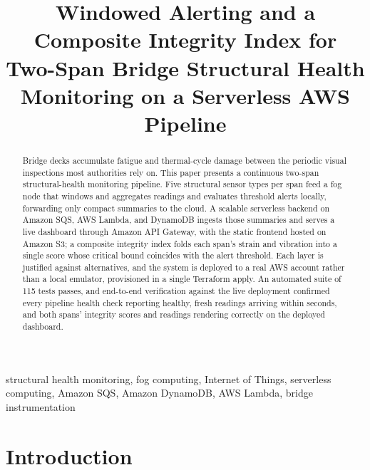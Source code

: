 \documentclass[conference]{IEEEtran}
\begin{document}
\title{Windowed Alerting and a Composite Integrity Index for Two-Span Bridge Structural Health Monitoring on a Serverless AWS Pipeline}

\author{
}

\maketitle

\begin{abstract}
Bridge decks accumulate fatigue and thermal-cycle damage between the periodic visual inspections most authorities rely on. This paper presents a continuous two-span structural-health monitoring pipeline. Five structural sensor types per span feed a fog node that windows and aggregates readings and evaluates threshold alerts locally, forwarding only compact summaries to the cloud. A scalable serverless backend on Amazon SQS, AWS Lambda, and DynamoDB ingests those summaries and serves a live dashboard through Amazon API Gateway, with the static frontend hosted on Amazon S3; a composite integrity index folds each span's strain and vibration into a single score whose critical bound coincides with the alert threshold. Each layer is justified against alternatives, and the system is deployed to a real AWS account rather than a local emulator, provisioned in a single Terraform apply. An automated suite of 115 tests passes, and end-to-end verification against the live deployment confirmed every pipeline health check reporting healthy, fresh readings arriving within seconds, and both spans' integrity scores and readings rendering correctly on the deployed dashboard.
\end{abstract}

\begin{IEEEkeywords}
structural health monitoring, fog computing, Internet of Things, serverless computing, Amazon SQS, Amazon DynamoDB, AWS Lambda, bridge instrumentation
\end{IEEEkeywords}

\section{Introduction}
\end{document}
